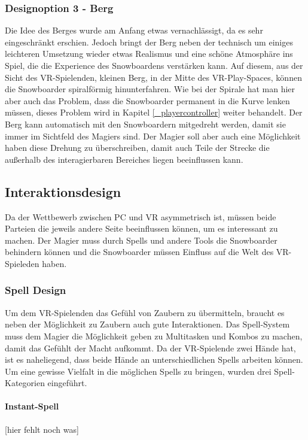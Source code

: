 \subsubsection{Designoption 3 - Berg}

Die Idee des Berges wurde am Anfang etwas vernachlässigt, da es sehr eingeschränkt erschien. Jedoch bringt der Berg neben der technisch um einiges leichteren Umsetzung wieder etwas Realismus und eine schöne Atmosphäre ins Spiel, die die Experience des Snowboardens verstärken kann. Auf diesem, aus der Sicht des VR-Spielenden, kleinen Berg, in der Mitte des VR-Play-Spaces, können die Snowboarder spiralförmig hinunterfahren. Wie bei der Spirale hat man hier aber auch das Problem, dass die Snowboarder permanent in die Kurve lenken müssen, dieses Problem wird in Kapitel \ref{_playercontroller} weiter behandelt. Der Berg kann automatisch mit den Snowboardern mitgedreht werden, damit sie immer im Sichtfeld des Magiers sind. Der Magier soll aber auch eine Möglichkeit haben diese Drehung zu überschreiben, damit auch Teile der Strecke die außerhalb des interagierbaren Bereiches liegen beeinflussen kann.

\subsection{Interaktionsdesign}

Da der Wettbewerb zwischen PC und VR asymmetrisch ist, müssen beide Parteien die jeweils andere Seite beeinflussen können, um es interessant zu machen. Der Magier muss durch Spells und andere Tools die Snowboarder behindern können und die Snowboarder müssen Einfluss auf die Welt des VR-Spieleden haben.

\subsubsection{Spell Design\label{_spell_design}}

Um dem VR-Spielenden das Gefühl von Zaubern zu übermitteln, braucht es neben der Möglichkeit zu Zaubern auch gute Interaktionen. Das Spell-System muss dem Magier die Möglichkeit geben zu Multitasken und Kombos zu machen, damit das Gefühlt der Macht aufkommt. Da der VR-Spielende zwei Hände hat, ist es naheliegend, dass beide Hände an unterschiedlichen Spells arbeiten können. Um eine gewisse Vielfalt in die möglichen Spells zu bringen, wurden drei Spell-Kategorien eingeführt.

\paragraph{Instant-Spell}
[hier fehlt noch was]
